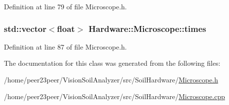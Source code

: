 Definition at line 79 of file Microscope.\+h.

\hypertarget{class_hardware_1_1_microscope_a5aababdeaa4cc4da051c0e44cba20003}{}
\subsubsection[{times}]{\setlength{\rightskip}{0pt plus 5cm}std\+::vector$<$float$>$ Hardware\+::\+Microscope\+::times\hspace{0.3cm}{\ttfamily [private]}}\label{class_hardware_1_1_microscope_a5aababdeaa4cc4da051c0e44cba20003}


Definition at line 87 of file Microscope.\+h.



The documentation for this class was generated from the following files\+:\begin{DoxyCompactItemize}
\item 
/home/peer23peer/\+Vision\+Soil\+Analyzer/src/\+Soil\+Hardware/\hyperlink{_microscope_8h}{Microscope.\+h}\item 
/home/peer23peer/\+Vision\+Soil\+Analyzer/src/\+Soil\+Hardware/\hyperlink{_microscope_8cpp}{Microscope.\+cpp}\end{DoxyCompactItemize}
